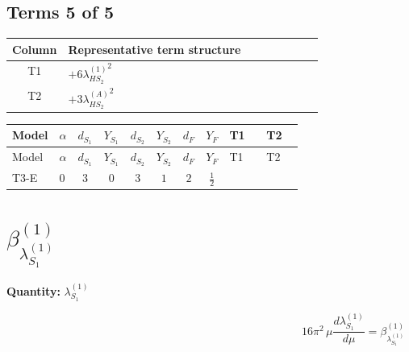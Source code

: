 \documentclass[8pt]{article}
\begin{document}
\begin{landscape}
\subsection*{Terms 5 of 5}
\begin{center}
\begin{tabular}{@{}c >{\raggedright\arraybackslash}p{0.82\linewidth}@{}}
\toprule
Column & Representative term structure \\
\midrule
T1 & \(\displaystyle +6 {\lambda_{HS_2}^{(1)}}^2\) \\
\midrule
T2 & \(\displaystyle +3 {\lambda_{HS_2}^{(A)}}^2\) \\
\midrule
\bottomrule
\end{tabular}
\end{center}
\smallskip
\tiny
\begin{longtable}{@{}llcccccc >{\raggedright\arraybackslash}p{0.21\linewidth} >{\raggedright\arraybackslash}p{0.21\linewidth}@{}}
\toprule
Model & $\alpha$ & $d_{S_1}$ & $Y_{S_1}$ & $d_{S_2}$ & $Y_{S_2}$ & $d_F$ & $Y_F$ & T1 & T2 \\
\midrule
\endfirsthead
\toprule
Model & $\alpha$ & $d_{S_1}$ & $Y_{S_1}$ & $d_{S_2}$ & $Y_{S_2}$ & $d_F$ & $Y_F$ & T1 & T2 \\
\midrule
\endhead
T3-E & $0$ & $3$ & $0$ & $3$ & $1$ & $2$ & $\frac{1}{2}$ & \scriptsize\adjustbox{max width=\linewidth}{$\begin{gathered} +6 {\lambda_{HS_2}^{(1)}}^2\end{gathered}$} & \scriptsize\adjustbox{max width=\linewidth}{$\begin{gathered} +3 {\lambda_{HS_2}^{(A)}}^2\end{gathered}$} \\
\midrule
\bottomrule
\end{longtable}
\clearpage
\section*{$\beta_{\lambda_{S_1}^{(1)}}^{(1)}$}
\noindent\textbf{Quantity: }$\lambda_{S_1}^{(1)}$\par\smallskip
\[16\pi^2\,\mu\frac{d \lambda_{S_1}^{(1)}}{d\mu}=\beta_{\lambda_{S_1}^{(1)}}^{(1)}\]

\end{landscape}
\end{document}
